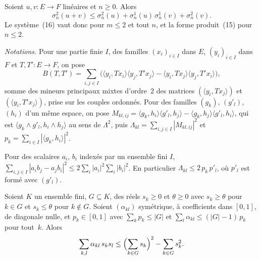 \begin{encadre}
\begin{theoreme}[Grothendieck, pages 71 et 72, le système (16) pour $m = 2$\pisteresolue{1-sigma-nm-system}]
Soient $u, v : E \to F$ linéaires et $n \geq 0$. Alors
\[
  \sigma_n^2(u+v) \leq \sigma_n^2(u) + \sigma_n^1(u)\,\sigma_n^1(v) + \sigma_n^2(v).
\]
Le système~(16) vaut donc pour $m \leq 2$ et tout $n$, et la forme produit~(15) pour $n \leq 2$.
\end{theoreme}
\end{encadre}

\noindent\emph{Notations.} Pour une partie finie $I$, des familles $(x_i)_{i \in I}$ dans $E$, $(y_i)_{i \in I}$ dans $F$ et $T, T' : E \to F$, on pose
\[
  B(T, T') = \sum_{i, j \in I} \bigl( \langle y_i, Tx_i\rangle \langle y_j, T'x_j\rangle - \langle y_i, Tx_j\rangle \langle y_j, T'x_i\rangle \bigr),
\]
somme des mineurs principaux mixtes d'ordre~$2$ des matrices $(\langle y_i, Tx_j\rangle)$ et $(\langle y_i, T'x_j\rangle)$, prise sur les couples ordonnés. Pour des familles $(g_k)$, $(g'_l)$, $(h_i)$ d'un même espace, on pose $M_{kl,ij} = \langle g_k, h_i\rangle \langle g'_l, h_j\rangle - \langle g_k, h_j\rangle \langle g'_l, h_i\rangle$, qui est $\langle g_k \wedge g'_l, h_i \wedge h_j\rangle$ au sens de $\Lambda^2$, puis $\Lambda_{kl} = \sum_{i,j \in I} |M_{kl,ij}|^2$ et $p_k = \sum_{i \in I} |\langle g_k, h_i\rangle|^2$.

\begin{lemme}[Lagrange]\label{lem:1-lagrange}
Pour des scalaires $a_i$, $b_i$ indexés par un ensemble fini $I$, $\sum_{i,j \in I} |a_i b_j - a_j b_i|^2 \leq 2 \sum_i |a_i|^2 \sum_i |b_i|^2$. En particulier $\Lambda_{kl} \leq 2\,p_k\,p'_l$, où $p'_l$ est formé avec $(g'_l)$.
\end{lemme}


\begin{lemme}\label{lem:1-poids2}
Soient $K$ un ensemble fini, $G \subseteq K$, des réels $s_k \geq 0$ et $\theta \geq 0$ avec $s_k \geq \theta$ pour $k \in G$ et $s_k \leq \theta$ pour $k \notin G$. Soient $(\alpha_{kl})$ symétrique, à coefficients dans $[0,1]$, de diagonale nulle, et $p_k \in [0,1]$ avec $\sum_k p_k \leq |G|$ et $\sum_l \alpha_{kl} \leq (|G| - 1)\,p_k$ pour tout~$k$. Alors
\[
  \sum_{k,l} \alpha_{kl}\, s_k s_l \leq \Bigl(\sum_{k \in G} s_k\Bigr)^2 - \sum_{k \in G} s_k^2 .
\]
\end{lemme}

